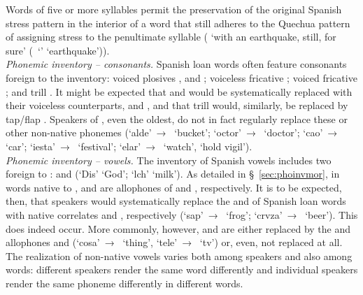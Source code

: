 {Words of five or more syllables permit the preservation of the original Spanish stress pattern in the interior of a word that still adheres to the Quechua pattern of assigning stress to the penultimate syllable ( ‘with an earthquake, still, for sure’ (\Sp~‘’ ‘earthquake’)).\\

\noindent
\textit{Phonemic inventory -- consonants.} Spanish loan words often feature consonants foreign to the \SYQ{} inventory: voiced plosives ,  and ; voiceless fricative ; voiced fricative ; and trill . It might be expected that \textipa{[b]} and \textipa{[d]} would be systematically replaced with their voiceless counterparts, \textipa{[p]} and \textipa{[t]}, and that trill \textipa{[r]} would, similarly, be replaced by tap/flap \textipa{[ɾ]}. Speakers of \SYQ, even the oldest, do not in fact regularly replace these or other non-native phonemes (‘alde’~→~ ‘bucket’; ‘octor’~→~ ‘doctor’; ‘cao’~→~ ‘car’; ‘iesta’~→~ ‘festival’; ‘elar’~→~ ‘watch’, ‘hold vigil’).\\

\noindent
\textit{Phonemic inventory -- vowels.} The inventory of Spanish vowels includes two foreign to \SYQ{}:  and  (‘Dis’ ‘God’; ‘lch’ ‘milk’). As detailed in §~\ref{sec:phoinvmor}, in words native to \SYQ, \textipa{[o]} and \textipa{[e]} are allophones of  and , respectively. It is to be expected, then, that speakers would systematically replace the \textipa{[o]} and \textipa{[e]} of Spanish loan words with native correlates \textipa{[u]} and \textipa{[i]}, respectively (‘sap’~→~ ‘frog’; ‘crvza’~→~ ‘beer’). This does indeed occur. More commonly, however, \textipa{[o]} and \textipa{[e]} are either replaced by the  and  allophones \textipa{[υ]} and \textipa{[ɪ]} (‘cosa’~→~\textipa{[kυsa]} ‘thing’, ‘tele’~→~\textipa{[tɪlɪ]} ‘tv’) or, even, not replaced at all. The realization of non-native vowels varies both among speakers and also among words: different speakers render the same word differently and individual speakers render the same phoneme differently in different words.\\

}
